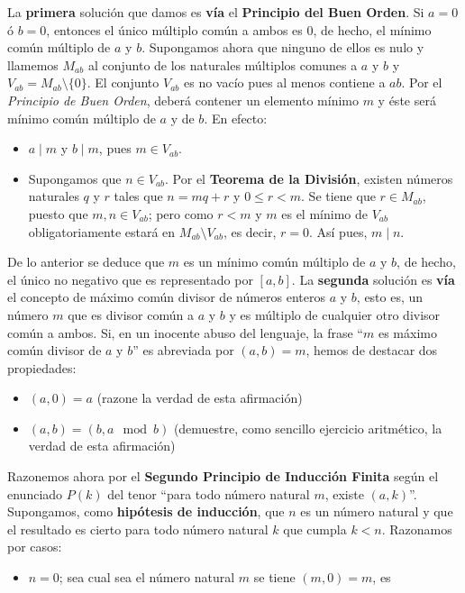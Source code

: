 \begin{solution}
  La \textbf{primera} solución que damos es \textbf{vía} el
  \textbf{Principio del Buen Orden}. Si $a=0$ ó $b=0$, entonces el
  único múltiplo común a ambos es $0$, de hecho, el mínimo común
  múltiplo de $a$ y $b$. Supongamos ahora que ninguno de ellos es nulo
  y llamemos $M_{ab}$ al conjunto de los naturales múltiplos comunes a
  $a$ y $b$ y $V_{ab}=M_{ab}\setminus\{0\}$.  El conjunto $V_{ab}$ es
  no vacío pues al menos contiene a $ab$. Por el \textit{Principio de
    Buen Orden}, deberá contener un elemento mínimo $m$ y éste será
  mínimo común múltiplo de $a$ y de $b$. En efecto:
  \begin{itemize}
  \item $a\mid m$ y $b\mid m$, pues $m\in V_{ab}$.
  \item Supongamos que $n\in V_{ab}$. Por el \textbf{Teorema de la
      División}, existen números naturales $q$ y $r$ tales que
    $n=mq+r$ y $0\leq r<m$. Se tiene que $r\in M_{ab}$, puesto que
    $m,n\in V_{ab}$; pero como $r<m$ y $m$ es el mínimo de $V_{ab}$
    obligatoriamente estará en $M_{ab}\setminus V_{ab}$, es decir,
    $r=0$. Así pues, $m\mid n$.  
  \end{itemize}
  De lo anterior se deduce que $m$ es un mínimo común múltiplo de $a$
  y $b$, de hecho, el único no negativo que es representado por
  $[a,b]$. La \textbf{segunda} solución es \textbf{vía} el concepto de
  máximo común divisor de números enteros $a$ y $b$, esto es, un
  número $m$ que es divisor común a $a$ y $b$ y es múltiplo de
  cualquier otro divisor común a ambos. Si, en un inocente abuso del
  lenguaje, la frase ``$m$ es máximo común divisor de $a$ y $b$'' es
  abreviada por $(a,b)=m$, hemos de destacar dos propiedades:
  \begin{itemize}
  \item $(a,0)=a$ (razone la verdad de esta afirmación)
  \item $(a,b)=(b,a\mod b)$ (demuestre, como sencillo ejercicio
    aritmético, la verdad de esta afirmación)
  \end{itemize}
  Razonemos ahora por el \textbf{Segundo Principio de Inducción
    Finita} según el enunciado $P(k)$ del tenor ``para todo número
  natural $m$, existe $(a,k)$''. Supongamos, como \textbf{hipótesis de
  inducción}, que $n$ es un número natural y que el resultado es cierto
para todo número natural $k$ que cumpla $k<n$. Razonamos por casos:
\begin{itemize}
\item $n=0$; sea cual sea el número natural $m$ se tiene $(m,0)=m$, es

\end{itemize}
\end{solution}
